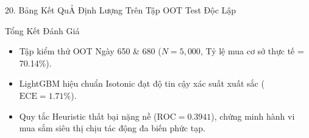 \documentclass[aspectratio=169, 10pt]{beamer}
\begin{document}
\begin{frame}{20. Bảng Kết QuẢ Định Lượng Trên Tập OOT Test Độc Lập}
  \centering
  \small
  \setlength{\tabcolsep}{4.5pt}
  \vspace{0.25cm}
  \begin{block}{Tổng Kết Đánh Giá}
    \small
    \begin{itemize}\setlength{\itemsep}{2pt}
      \item Tập kiểm thử OOT Ngày 650 \& 680 ($N=5,000$, Tỷ lệ mua cơ sở thực tế = 70.14\%).
      \item LightGBM hiệu chuẩn Isotonic đạt độ tin cậy xác suất xuất sắc ($\text{ECE} = 1.71\%$).
      \item Quy tắc Heuristic thất bại nặng nề ($\text{ROC} = 0.3941$), chứng minh hành vi mua sắm siêu thị chịu tác động đa biến phức tạp.
    \end{itemize}
  \end{block}
\end{frame}
\end{document}
